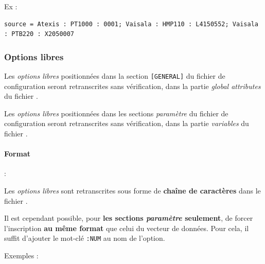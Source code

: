 Ex :\\

\begin{Verbatim}[fontsize=\myfontsize]
source = Atexis : PT1000 : 0001; Vaisala : HMP110 : L4150552; Vaisala : PTB220 : X2050007
\end{Verbatim}

\subsubsection{Options libres}\label{ref:options_libres}

  Les \textit{options libres} positionnées dans la section
  \texttt{[GENERAL]} du fichier de configuration seront
  retranscrites sans vérification, dans la partie \textit{global
  attributes} du fichier \netcdf.
  \medbreak

  Les \textit{options libres} positionnées dans les sections \textit{paramètre}
  du fichier de configuration seront retranscrites sans vérification, dans
  la partie \textit{variables} du fichier \netcdf.


\paragraph{Format} :

Les \textit{options libres} sont retranscrites sous forme de
\textbf{chaîne de caractères} dans le fichier \netcdf.

Il est cependant possible, pour \textbf{les sections \textit{paramètre}
seulement}, de forcer l'inscription \textbf{au même format} que celui
du vecteur de données. Pour cela, il suffit d'ajouter le mot-clé \texttt{:NUM}
au nom de l'option.
\medbreak

Exemples :

